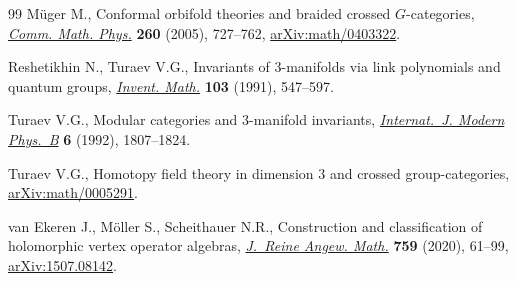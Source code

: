\begin{thebibliography}{99}
M\"uger M., Conformal orbifold theories and braided crossed {$G$}-categories,
 \href{https://doi.org/10.1007/s00220-005-1291-z}{\textit{Comm. Math. Phys.}}
 \textbf{260} (2005), 727--762,
 \href{https://arxiv.org/abs/math/0403322}{arXiv:math/0403322}.

Reshetikhin N., Turaev V.G., Invariants of {$3$}-manifolds via link polynomials
 and quantum groups, \href{https://doi.org/10.1007/BF01239527}{\textit{Invent.
 Math.}} \textbf{103} (1991), 547--597.

Turaev V.G., Modular categories and {$3$}-manifold invariants,
 \href{https://doi.org/10.1142/S0217979292000876}{\textit{Internat.~J. Modern
 Phys.~B}} \textbf{6} (1992), 1807--1824.

Turaev V.G., Homotopy field theory in dimension $3$ and crossed
 group-categories,
 \href{https://arxiv.org/abs/math/0005291}{arXiv:math/0005291}.

van Ekeren J., M\"oller S., Scheithauer N.R., Construction and classification
 of holomorphic vertex operator algebras,
 \href{https://doi.org/10.1515/crelle-2017-0046}{\textit{J.~Reine Angew.
 Math.}} \textbf{759} (2020), 61--99,
 \href{https://arxiv.org/abs/1507.08142}{arXiv:1507.08142}.

\end{thebibliography}
